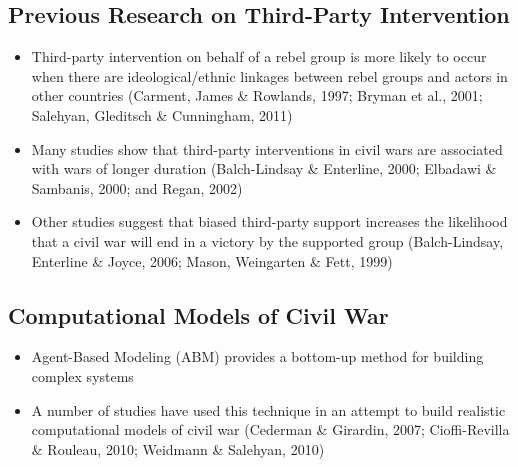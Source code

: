\subsection{Previous Research on Third-Party Intervention}
\label{lit}

\begin{itemize}
	\item Third-party intervention on behalf of a rebel group is more likely to occur when there are ideological/ethnic linkages between rebel groups and actors in other countries (Carment, James \& Rowlands, 1997; Bryman et al., 2001; Salehyan, Gleditsch \& Cunningham, 2011) 
	\item Many studies show that third-party interventions in civil wars are associated with wars of longer duration (Balch-Lindsay \& Enterline, 2000; Elbadawi \& Sambanis, 2000; and Regan, 2002)
	\item Other studies suggest that biased third-party support increases the likelihood that a civil war will end in a victory by the supported group (Balch-Lindsay, Enterline \& Joyce, 2006; Mason, Weingarten \& Fett, 1999)
\end{itemize}

\subsection{Computational Models of Civil War}
\begin{itemize}
	\item Agent-Based Modeling (ABM) provides a bottom-up method for building complex systems
	\item A number of studies have used this technique in an attempt to build realistic computational models of civil war (Cederman \& Girardin, 2007; Cioffi-Revilla \& Rouleau, 2010; Weidmann \& Salehyan, 2010)
\end{itemize}
